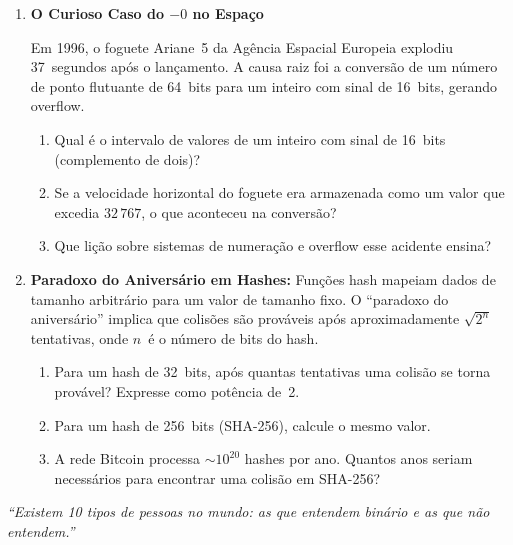 \documentclass[11pt, a4paper]{article}
\begin{document}
\begin{enumerate}[resume]

\item \textbf{O Curioso Caso do $-0$ no Espa\c{c}o}

Em 1996, o foguete Ariane~5 da Ag\^{e}ncia Espacial Europeia explodiu 37~segundos ap\'{o}s o lan\c{c}amento. A causa raiz foi a convers\~{a}o de um n\'{u}mero de ponto flutuante de 64~bits para um inteiro com sinal de 16~bits, gerando overflow.
\begin{enumerate}
  \item Qual \'{e} o intervalo de valores de um inteiro com sinal de 16~bits (complemento de dois)?
  \item Se a velocidade horizontal do foguete era armazenada como um valor que excedia $32\,767$, o que aconteceu na convers\~{a}o?
  \item Que li\c{c}\~{a}o sobre sistemas de numera\c{c}\~{a}o e overflow esse acidente ensina?
\end{enumerate}

\item \textbf{Paradoxo do Anivers\'{a}rio em Hashes:} Fun\c{c}\~{o}es hash mapeiam dados de tamanho arbitr\'{a}rio para um valor de tamanho fixo. O ``paradoxo do anivers\'{a}rio'' implica que colis\~{o}es s\~{a}o prov\'{a}veis ap\'{o}s aproximadamente $\sqrt{2^n}$ tentativas, onde $n$~\'{e} o n\'{u}mero de bits do hash.
\begin{enumerate}
  \item Para um hash de 32~bits, ap\'{o}s quantas tentativas uma colis\~{a}o se torna prov\'{a}vel? Expresse como pot\^{e}ncia de~2.
  \item Para um hash de 256~bits (SHA-256), calcule o mesmo valor.
  \item A rede Bitcoin processa $\sim 10^{20}$ hashes por ano. Quantos anos seriam necess\'{a}rios para encontrar uma colis\~{a}o em SHA-256?
\end{enumerate}

\end{enumerate}

\vfill
\begin{center}
\textit{``Existem 10 tipos de pessoas no mundo: as que entendem bin\'{a}rio e as que n\~{a}o entendem.''}
\end{center}
\end{document}
